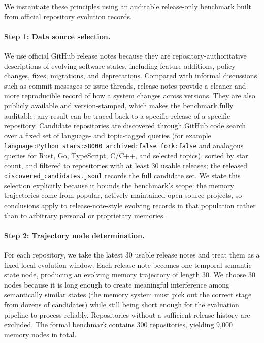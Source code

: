 We instantiate these principles using an auditable release-only benchmark built from official repository evolution records.

\paragraph{Step 1: Data source selection.}
We use official GitHub release notes because they are repository-authoritative descriptions of evolving software states, including feature additions, policy changes, fixes, migrations, and deprecations. Compared with informal discussions such as commit messages or issue threads, release notes provide a cleaner and more reproducible record of how a system changes across versions. They are also publicly available and version-stamped, which makes the benchmark fully auditable: any result can be traced back to a specific release of a specific repository. Candidate repositories are discovered through GitHub code search over a fixed set of language- and topic-tagged queries (for example \texttt{language:Python stars:>8000 archived:false fork:false} and analogous queries for Rust, Go, TypeScript, C/C++, and selected topics), sorted by star count, and filtered to repositories with at least 30 usable releases; the released \texttt{discovered\_candidates.jsonl} records the full candidate set. We state this selection explicitly because it bounds the benchmark's scope: the memory trajectories come from popular, actively maintained open-source projects, so conclusions apply to release-note-style evolving records in that population rather than to arbitrary personal or proprietary memories.

\paragraph{Step 2: Trajectory node determination.}
For each repository, we take the latest 30 usable release notes and treat them as a fixed local evolution window. Each release note becomes one temporal semantic state node, producing an evolving memory trajectory of length 30. We choose 30 nodes because it is long enough to create meaningful interference among semantically similar states (the memory system must pick out the correct stage from dozens of candidates) while still being short enough for the evaluation pipeline to process reliably. Repositories without a sufficient release history are excluded. The formal benchmark contains 300 repositories, yielding 9{,}000 memory nodes in total.

